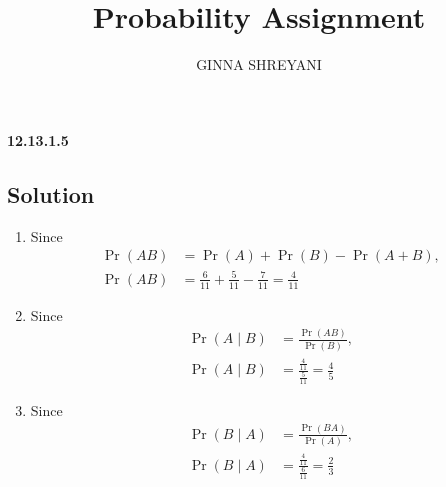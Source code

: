 \documentclass[10pt,twocolumn]{article}
\title{
Probability Assignment
}
\author{GINNA SHREYANI}
\date{}
\providecommand{\pr}[1]{\ensuremath{\Pr\left(#1\right)}}
\begin{document}
\maketitle


\textbf{12.13.1.5}\\
\subsection*{Solution}
\fi
\begin{enumerate}
	\item Since
\begin{align}
	\pr{AB} &= \pr{A} + \pr{B} -\pr{A+B},
	\label{eq:1}
	\\
	\pr{AB} &= \frac{6}{11} + \frac{5}{11} - \frac{7}{11}
 = \frac{4}{11}
\end{align}
	\item Since
\begin{align}
	\pr{A \mid B} &= \frac{\pr{AB}}{\pr{B}},
	\label{eq:2}
	\\
	\pr{A \mid B} &= \frac{\frac{4}{11}}{\frac{5}{11}}
 = \frac{4}{5}
\end{align}
	\item Since
\begin{align}
	\pr{B \mid A}&=\frac{\pr{BA}}{\pr{A}},
	\label{eq:3}
	\\
	\pr{B \mid A} &= \frac{\frac{4}{11}}{\frac{6}{11}}
	 = \frac{2}{3}
\end{align}
\end{enumerate}
\end{document}
